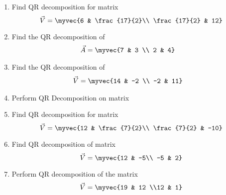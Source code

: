 \begin{enumerate}[label=\thesubsection.\arabic*.,ref=\thesubsection.\theenumi]
\solution

%
\item 
Find QR decomposition for matrix
\begin{equation}
	\vec{V} = \myvec{6 & \frac{17}{2}\\ \frac{17}{2} & 12}
\end{equation}
%
\solution

%
\item 
Find the QR decomposition of 
\begin{align}
    \vec{A} &= \myvec{7 & 3 \\ 2 & 4} 
\end{align}
%
\solution

\item Find the QR decomposition of
\begin{align}
\vec{V} &= \myvec{14  & -2 \\ -2 & 11}
\end{align}
\solution

\item 
Perform QR Decomposition on matrix  
%
\solution

%
\item Find QR decomposition for matrix
\begin{equation}
	\vec{V} = \myvec{12 & \frac{7}{2}\\ \frac{7}{2} & -10}
\end{equation}

\solution

\item Find QR decomposition of matrix
\begin{equation}
	\vec{V} = \myvec{12 & -5\\ -5 & 2}
\end{equation}

%
\solution

\item Perform QR decomposition of the matrix
\begin{align}
    \vec{V} = \myvec{19 & 12 \\12 & 1} \label{eq:solutions/4/1/42/1.1}
\end{align}

\solution


\end{enumerate}

